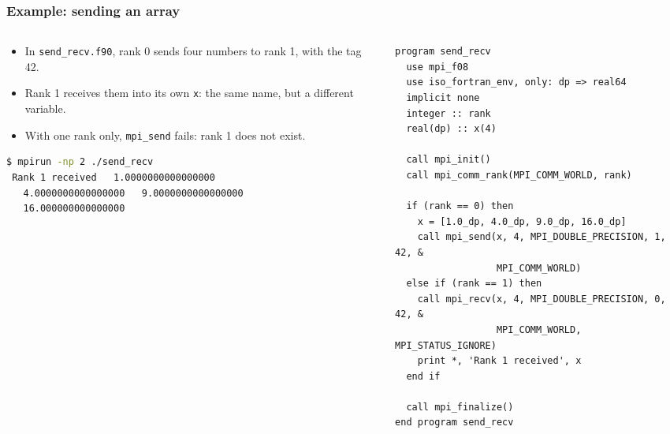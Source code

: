 \begin{frame}[fragile]
  \frametitle{Example: sending an array}
  \begin{columns}[T]
    \begin{column}{0.42\textwidth}
      \begin{itemize}
        \item In \texttt{send\_recv.f90}, rank 0 sends four numbers to rank 1, with the tag 42.
        \item Rank 1 receives them into its own \texttt{x}: the same name, but a different variable.
        \item With one rank only, \texttt{mpi\_send} fails: rank 1 does not exist.
      \end{itemize}

\begin{lstlisting}[language=bash]
$ mpirun -np 2 ./send_recv
 Rank 1 received   1.0000000000000000
   4.0000000000000000   9.0000000000000000
   16.000000000000000
\end{lstlisting}
    \end{column}

    \begin{column}{0.58\textwidth}
\begin{lstlisting}[aboveskip=0pt, belowskip=0pt]
program send_recv
  use mpi_f08
  use iso_fortran_env, only: dp => real64
  implicit none
  integer :: rank
  real(dp) :: x(4)

  call mpi_init()
  call mpi_comm_rank(MPI_COMM_WORLD, rank)

  if (rank == 0) then
    x = [1.0_dp, 4.0_dp, 9.0_dp, 16.0_dp]
    call mpi_send(x, 4, MPI_DOUBLE_PRECISION, 1, 42, &
                  MPI_COMM_WORLD)
  else if (rank == 1) then
    call mpi_recv(x, 4, MPI_DOUBLE_PRECISION, 0, 42, &
                  MPI_COMM_WORLD, MPI_STATUS_IGNORE)
    print *, 'Rank 1 received', x
  end if

  call mpi_finalize()
end program send_recv
\end{lstlisting}
    \end{column}
  \end{columns}
\end{frame}


